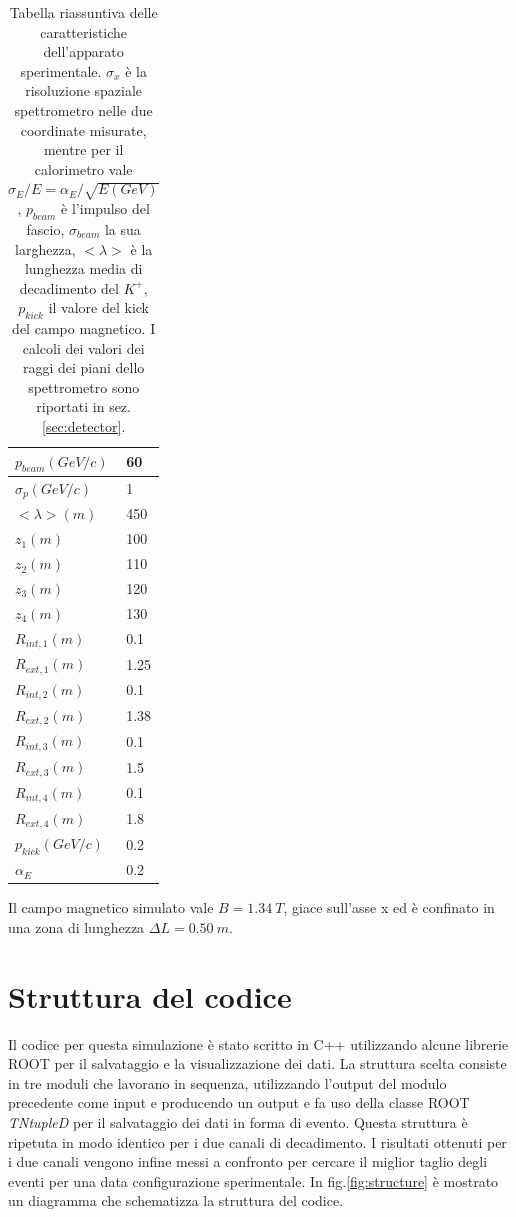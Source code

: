 \documentclass[8pt]{extarticle}
\begin{document}
\begin{table}[h!]
\centering
\begin{tabular}{|p{2.5 cm}| p{1 cm}|}
\hline\hline
$p_{beam} (GeV/c)$ & 60 \\
\hline
$\sigma_p (GeV/c)$ & 1 \\
\hline
$<\lambda> (m)$ & 450 \\
\hline
$z_1 (m)$ & 100 \\
\hline
$z_2 (m)$ & 110 \\
\hline
$z_3 (m)$ & 120 \\
\hline
$z_4 (m)$ & 130 \\
\hline
$R_{int,1} (m)$ & 0.1 \\
\hline
$R_{ext,1} (m)$ & 1.25 \\
\hline
$R_{int,2} (m)$ & 0.1 \\
\hline
$R_{ext,2} (m)$ & 1.38 \\
\hline
$R_{int,3} (m)$ & 0.1 \\
\hline
$R_{ext,3} (m)$ & 1.5 \\
\hline
$R_{int,4} (m)$ & 0.1 \\
\hline
$R_{ext,4} (m)$ & 1.8 \\
\hline
$p_{kick} (GeV/c)$ & 0.2 \\
\hline
$\alpha_E$ & 0.2 \\
\hline \hline
\end{tabular}
\caption{Tabella riassuntiva delle caratteristiche dell'apparato sperimentale. $\sigma_x$ è la risoluzione spaziale spettrometro nelle due coordinate misurate, mentre per il calorimetro vale $\sigma_E/E = \alpha_E/\sqrt{E(GeV)}$, $p_{beam}$ è l'impulso del fascio, $\sigma_{beam}$ la sua larghezza, $<\lambda>$ è la lunghezza media di decadimento del $K^+$, $p_{kick}$ il valore del kick del campo magnetico. I calcoli dei valori dei raggi dei piani dello spettrometro sono riportati in sez.\ref{sec:detector}.}
\label{tab:apparato}
\end{table}

Il campo magnetico simulato vale $B = 1.34\ T$, giace sull'asse x ed è confinato in una zona di lunghezza $\Delta L = 0.50\ m$.

\section{Struttura del codice} \label{sec:struttura}
Il codice per questa simulazione è stato scritto in C++ utilizzando alcune librerie ROOT per il salvataggio e la visualizzazione dei dati. 
La struttura scelta consiste in tre moduli che lavorano in sequenza, utilizzando l'output del modulo precedente come input e producendo un output e fa uso della classe ROOT \textit{TNtupleD} per il salvataggio dei dati in forma di evento. Questa struttura è ripetuta in modo identico per i due canali di decadimento. I risultati ottenuti per i due canali vengono infine messi a confronto per cercare il miglior taglio degli eventi per una data configurazione sperimentale. In fig.\ref{fig:structure} è mostrato un diagramma che schematizza la struttura del codice. 
\end{document}
